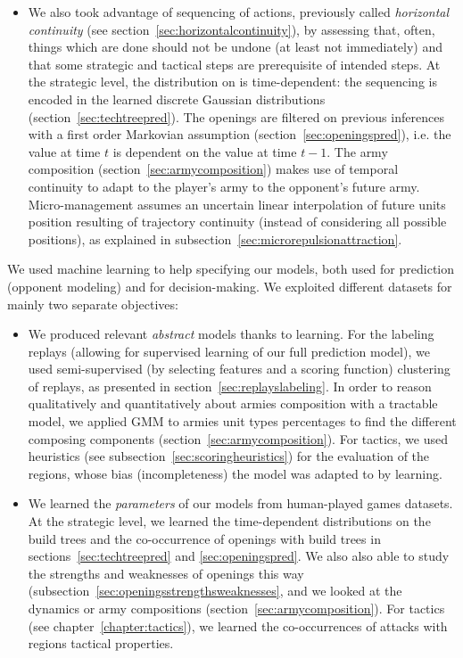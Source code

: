 \begin{itemize}
    \item We also took advantage of sequencing of actions, previously called \textit{horizontal continuity} (see section~\ref{sec:horizontalcontinuity}), by assessing that, often, things which are done should not be undone (at least not immediately) and that some strategic and tactical steps are prerequisite of intended steps. At the strategic level, the distribution on  is time-dependent: the sequencing is encoded in the learned discrete Gaussian distributions (section~\ref{sec:techtreepred}). The openings are filtered on previous inferences with a first order Markovian assumption (section~\ref{sec:openingspred}), i.e. the value at time $t$ is dependent on the value at time $t-1$. The army composition (section~\ref{sec:armycomposition}) makes use of temporal continuity to adapt to the player's army to the opponent's future army. %
Micro-management assumes an uncertain linear interpolation of future units position resulting of trajectory continuity (instead of considering all possible positions), as explained in subsection~\ref{sec:microrepulsionattraction}.
\end{itemize}

We used machine learning to help specifying our models, both used for prediction (opponent modeling) and for decision-making. We exploited different datasets for mainly two separate objectives:
\begin{itemize}
    \item We produced relevant \textit{abstract} models thanks to learning. For the labeling replays (allowing for supervised learning of our full  prediction model), we used semi-supervised (by selecting features and a scoring function)  clustering of replays, as presented in section~\ref{sec:replayslabeling}. In order to reason qualitatively and quantitatively about armies composition with a tractable model, we applied GMM to armies unit types percentages to find the different composing components (section~\ref{sec:armycomposition}). For tactics, we used heuristics (see subsection~\ref{sec:scoringheuristics}) for the evaluation of the regions, whose bias (incompleteness) the model was adapted to by learning.
    
    \item We learned the \textit{parameters} of our models from human-played games datasets. At the strategic level, we learned the time-dependent distributions on the build trees and the co-occurrence of openings with build trees in sections~\ref{sec:techtreepred} and \ref{sec:openingspred}. We also also able to study the strengths and weaknesses of openings this way (subsection~\ref{sec:openingsstrengthsweaknesses}, and we looked at the dynamics or army compositions (section~\ref{sec:armycomposition}). For tactics (see chapter~\ref{chapter:tactics}), we learned the co-occurrences of attacks with regions tactical properties.
\end{itemize}

